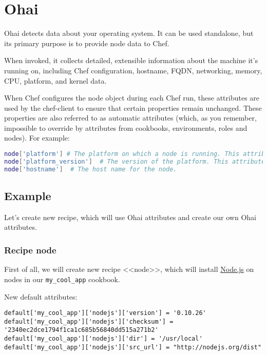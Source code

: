 \section{Ohai}
\label{sec:cookbook-ohai}

Ohai detects data about your operating system. It can be used standalone, but its primary purpose is to provide node data to Chef.

When invoked, it collects detailed, extensible information about the machine it's running on, including Chef configuration, hostname, FQDN, networking, memory, CPU, platform, and kernel data.

When Chef configures the node object during each Chef run, these attributes are used by the chef-client to ensure that certain properties remain unchanged. These properties are also referred to as automatic attributes (which, as you remember, impossible to override by attributes from cookbooks, environments, roles and nodes). For example:

\begin{lstlisting}[language=Bash,label=lst:cookbook-ohai1]
node['platform'] # The platform on which a node is running. This attribute helps determine which providers will be used.
node['platform_version']  # The version of the platform. This attribute helps determine which providers will be used.
node['hostname']  # The host name for the node.
\end{lstlisting}

\subsection{Example}

Let's create new recipe, which will use Ohai attributes and create our own Ohai attributes.

\subsubsection{Recipe node}

First of all, we will create new recipe <<node>>, which will install \href{http://nodejs.org/}{Node.js} on nodes in our \lstinline!my_cool_app! cookbook.

New default attributes:

\begin{lstlisting}[label=lst:cookbook-ohai-attributes,title=my-server-cloud/site-cookbooks/my\_cool\_app/attributes/node.rb]
default['my_cool_app']['nodejs']['version'] = '0.10.26'
default['my_cool_app']['nodejs']['checksum'] = '2340ec2dce1794f1ca1c685b56840dd515a271b2'
default['my_cool_app']['nodejs']['dir'] = '/usr/local'
default['my_cool_app']['nodejs']['src_url'] = "http://nodejs.org/dist"
\end{lstlisting}

